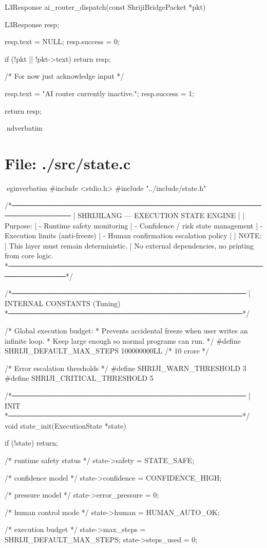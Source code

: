 \documentclass{article}
\begin{document}
L3Response ai_router_dispatch(const ShrijiBridgePacket *pkt)
{
    L3Response resp;

    resp.text = NULL;
    resp.success = 0;

    if (!pkt || !pkt->text)
        return resp;

    /* For now just acknowledge input */

    resp.text = "AI router currently inactive.";
    resp.success = 1;

    return resp;
}
nd{verbatim}
\section*{File: ./src/state.c}
egin{verbatim}
#include <stdio.h>
#include "../include/state.h"

/*──────────────────────────────────────────────────────────────
 | SHRIJILANG — EXECUTION STATE ENGINE
 |
 | Purpose:
 |   - Runtime safety monitoring
 |   - Confidence / risk state management
 |   - Execution limits (anti-freeze)
 |   - Human confirmation escalation policy
 |
 | NOTE:
 |   This layer must remain deterministic.
 |   No external dependencies, no printing from core logic.
 *──────────────────────────────────────────────────────────────*/

/*──────────────────────────────────────────────
 | INTERNAL CONSTANTS (Tuning)
 *──────────────────────────────────────────────*/

/* Global execution budget:
 * Prevents accidental freeze when user writes an infinite loop.
 * Keep large enough so normal programs can run.
 */
#define SHRIJI_DEFAULT_MAX_STEPS   100000000LL  /* 10 crore */

/* Error escalation thresholds */
#define SHRIJI_WARN_THRESHOLD      3
#define SHRIJI_CRITICAL_THRESHOLD  5

/*──────────────────────────────────────────────
 | INIT
 *──────────────────────────────────────────────*/
void state_init(ExecutionState *state)
{
    if (!state) return;

    /* runtime safety status */
    state->safety = STATE_SAFE;

    /* confidence model */
    state->confidence = CONFIDENCE_HIGH;

    /* pressure model */
    state->error_pressure = 0;

    /* human control mode */
    state->human = HUMAN_AUTO_OK;

    /* execution budget */
    state->max_steps  = SHRIJI_DEFAULT_MAX_STEPS;
    state->steps_used = 0;
}
\end{document}
